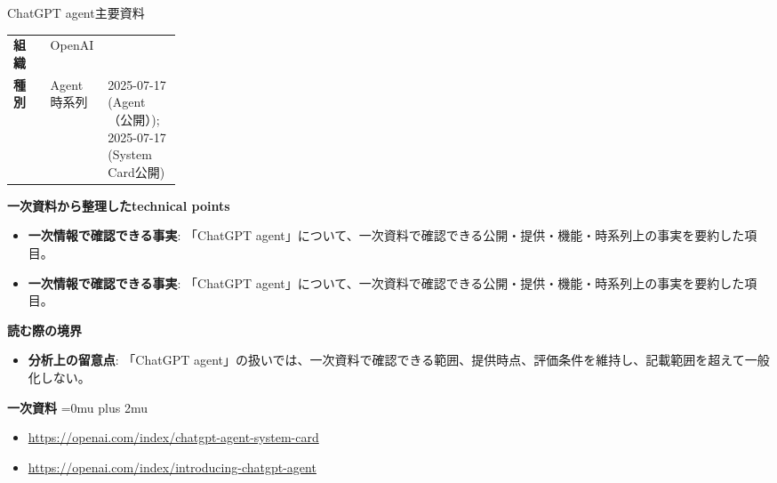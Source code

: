 \begin{technicalnote}{ChatGPT agent}{主要資料}
\begingroup
\begin{tabularx}{\linewidth}{@{}>{\bfseries}p{0.22\linewidth}X@{}}
組織 & OpenAI \\
種別 & Agent
時系列 & 2025-07-17 (Agent（公開）); 2025-07-17 (System Card公開) \\
\end{tabularx}
\smallskip
{\bfseries 一次資料から整理したtechnical points}
\begin{itemize}[leftmargin=1.5em,itemsep=0.35em]
\item \textbf{一次情報で確認できる事実}: 「ChatGPT agent」について、一次資料で確認できる公開・提供・機能・時系列上の事実を要約した項目。
\item \textbf{一次情報で確認できる事実}: 「ChatGPT agent」について、一次資料で確認できる公開・提供・機能・時系列上の事実を要約した項目。
\end{itemize}
\begin{minipage}{\linewidth}
{\bfseries 読む際の境界}
\begin{itemize}[leftmargin=1.5em,itemsep=0.35em]
\item \textbf{分析上の留意点}: 「ChatGPT agent」の扱いでは、一次資料で確認できる範囲、提供時点、評価条件を維持し、記載範囲を超えて一般化しない。
\end{itemize}
\begin{samepage}
{\bfseries 一次資料}
\begingroup\sloppy
\Urlmuskip=0mu plus 2mu\relax
\begin{itemize}[leftmargin=1.5em,itemsep=0.25em]
\item {\scriptsize\url{https://openai.com/index/chatgpt-agent-system-card}}
\item {\scriptsize\url{https://openai.com/index/introducing-chatgpt-agent}}
\end{itemize}
\endgroup
\end{samepage}
\end{minipage}
\endgroup
\end{technicalnote}
\medskip


